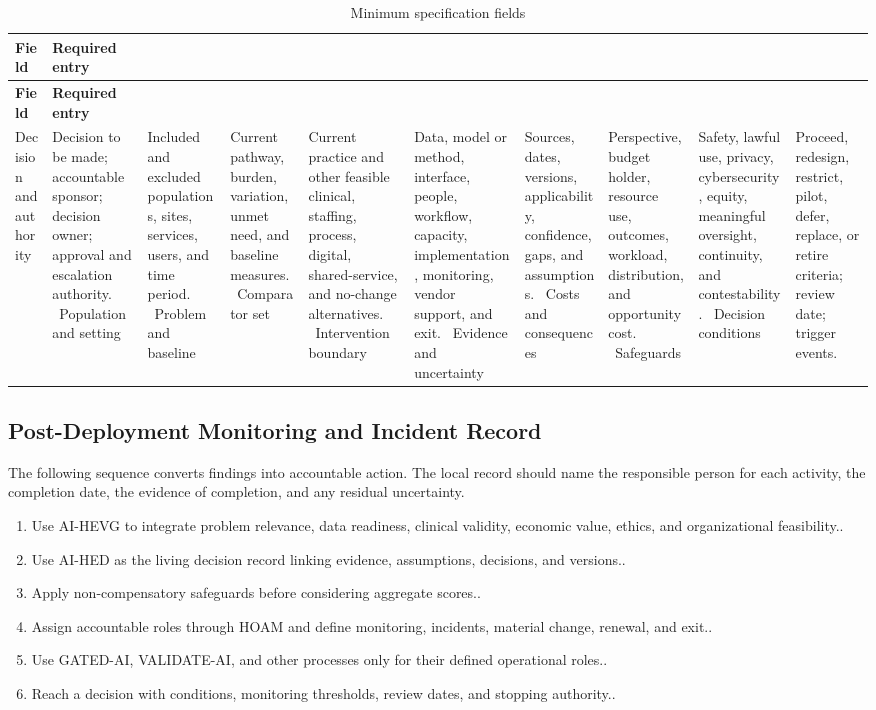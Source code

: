 \begin{longtable}{@{}p{}p{}@{}}
\caption{Minimum specification fields}
\label{tab:comp-ch12-spec-fields}\\
\toprule
\textbf{Field} & \textbf{Required entry} \\
\midrule
\endfirsthead
\toprule
\textbf{Field} & \textbf{Required entry} \\
\midrule
\endhead
\bottomrule
\endlastfoot
Decision and authority & Decision to be made; accountable sponsor; decision owner; approval and escalation authority. \
Population and setting & Included and excluded populations, sites, services, users, and time period. \
Problem and baseline & Current pathway, burden, variation, unmet need, and baseline measures. \
Comparator set & Current practice and other feasible clinical, staffing, process, digital, shared-service, and no-change alternatives. \
Intervention boundary & Data, model or method, interface, people, workflow, capacity, implementation, monitoring, vendor support, and exit. \
Evidence and uncertainty & Sources, dates, versions, applicability, confidence, gaps, and assumptions. \
Costs and consequences & Perspective, budget holder, resource use, outcomes, workload, distribution, and opportunity cost. \
Safeguards & Safety, lawful use, privacy, cybersecurity, equity, meaningful oversight, continuity, and contestability. \
Decision conditions & Proceed, redesign, restrict, pilot, defer, replace, or retire criteria; review date; trigger events. \
\end{longtable}

\subsection{Post-Deployment Monitoring and Incident Record}
\label{sec:comp-ch12-supp-2}
The following sequence converts findings into accountable action. The local record
should name the responsible person for each activity, the completion date, the
evidence of completion, and any residual uncertainty.

\begin{enumerate}
 \item Use AI-HEVG to integrate problem relevance, data readiness, clinical validity, economic value, ethics, and organizational feasibility..
 \item Use AI-HED as the living decision record linking evidence, assumptions, decisions, and versions..
 \item Apply non-compensatory safeguards before considering aggregate scores..
 \item Assign accountable roles through HOAM and define monitoring, incidents, material change, renewal, and exit..
 \item Use GATED-AI, VALIDATE-AI, and other processes only for their defined operational roles..
 \item Reach a decision with conditions, monitoring thresholds, review dates, and stopping authority..
\end{enumerate}

